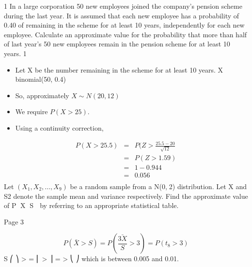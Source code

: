 \documentclass[a4paper,12pt]{article}
\begin{document}
1 In a large corporation 50 new employees joined the company’s pension scheme
during the last year. It is assumed that each new employee has a probability of 0.40
of remaining in the scheme for at least 10 years, independently for each new
employee.
Calculate an approximate value for the probability that more than half of last year’s
50 new employees remain in the pension scheme for at least 10 years. 
\newpage
1 

\begin{itemize}
    \item Let X be the number remaining in the scheme for at least 10 years.
X ~ binomial(50, 0.4)
\item So, approximately $X \sim N(20, 12)$
\item We require $P(X > 25)$.
\item Using a continuity correction,
\end{itemize}

\begin{eqnarray*}
P(X > 25.5) &=& P ( Z > \frac{25.5 − 20}{\sqrt{12}}\\
&=& P ( Z > 1.59) \\
&=& 1 − 0.944 \\
&=& 0.056\\
\end{eqnarray*}
 Let $(X_1, X_2, … , X_9)$ be a random sample from a N(0,2) distribution. Let X and
S2 denote the sample mean and variance respectively.
Find the approximate value of P X  S  by referring to an appropriate statistical
table. 




Page 3

\[ P(\bar{X} > S) = P( \frac{\bar{3X}}{S} > 3) = P(t_8 > 3)\] 
S
⎛ ⎞
> = ⎜ > ⎟ = >
⎝ ⎠
which is between 0.005 and 0.01.
\end{document}
